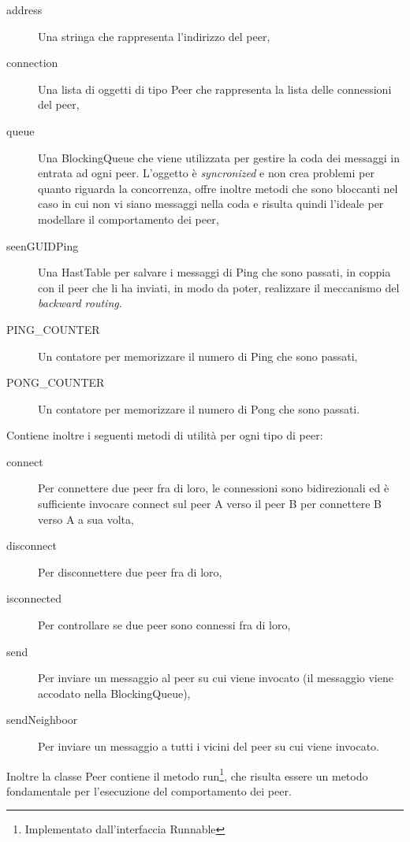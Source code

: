 \documentclass[a4paper,11pt]{article}
\begin{document}
\begin{description}
\item[\textsf{address}] Una stringa che rappresenta l'indirizzo del peer,
\item[\textsf{connection}] Una lista di oggetti di tipo \textsf{Peer} che rappresenta la lista delle connessioni del peer,
\item[\textsf{queue}] Una \textsf{BlockingQueue} che viene utilizzata per gestire la coda dei messaggi in entrata ad ogni peer. L'oggetto \`e \emph{syncronized} e non crea problemi per quanto riguarda la concorrenza, offre inoltre metodi che sono bloccanti nel caso in cui non vi siano messaggi nella coda e risulta quindi l'ideale per modellare il comportamento dei peer,
\item[\textsf{seenGUIDPing}] Una \textsf{HastTable} per salvare i messaggi di Ping che sono passati, in coppia con il peer che li ha inviati, in modo da poter, realizzare il meccanismo del \emph{backward routing}.
\item[\textsf{PING\_COUNTER}] Un contatore per memorizzare il numero di Ping che sono passati,
\item[\textsf{PONG\_COUNTER}] Un contatore per memorizzare il numero di Pong che sono passati.
\end{description}

Contiene inoltre i seguenti metodi di utilit\`a per ogni tipo di peer:

\begin{description}
\item[\textsf{connect}] Per connettere due peer fra di loro, le connessioni sono bidirezionali ed \`e sufficiente invocare connect sul peer \textsf{A} verso il peer \textsf{B} per connettere \textsf{B} verso \textsf{A} a sua volta,
\item[\textsf{disconnect}] Per disconnettere due peer fra di loro,
\item[\textsf{isconnected}] Per controllare se due peer sono connessi fra di loro,
\item[\textsf{send}] Per inviare un messaggio al peer su cui viene invocato (il messaggio viene accodato nella \textsf{BlockingQueue}),
\item[\textsf{sendNeighboor}] Per inviare un messaggio a tutti i vicini del peer su cui viene invocato.
\end{description}

Inoltre la classe \textsf{Peer} contiene il metodo \textsf{run}\footnote{Implementato dall'interfaccia \textsf{Runnable}}, che risulta essere un metodo fondamentale per l'esecuzione del comportamento dei peer. 
\end{document}
